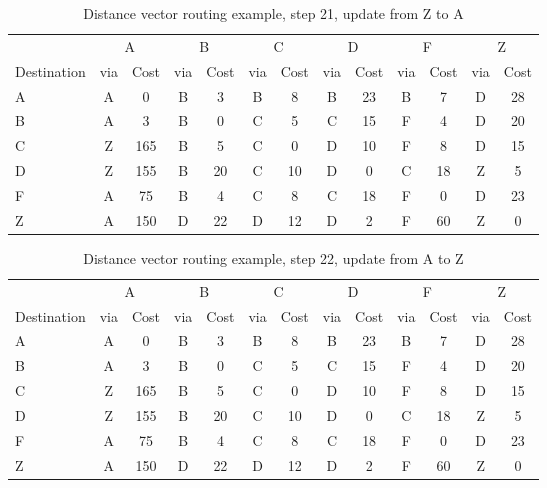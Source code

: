 \begin{table}
    \caption{Distance vector  routing example, step 21, update from Z to A }
    \label{tab:dv:step:21}
\begin{tabular}{l|c|c|c|c|c|c|c|c|c|c|c|c}
    \toprule
      & \multicolumn{2}{c|}{A}&\multicolumn{2}{c|}{B}&\multicolumn{2}{c|}{C}&\multicolumn{2}{c|}{D}&\multicolumn{2}{c|}{F}&\multicolumn{2}{c|}{Z} \\
    Destination & via&Cost&via&Cost&via&Cost&via&Cost&via&Cost&via&Cost \\ 
    \midrule
    A & A & 0 &B & 3 &B & 8 &B & 23 &B & 7 &D & 28 
 \\B & A & 3 &B & 0 &C & 5 &C & 15 &F & 4 &D & 20 
 \\C & Z & 165 &B & 5 &C & 0 &D & 10 &F & 8 &D & 15 
 \\D & Z & 155 &B & 20 &C & 10 &D & 0 &C & 18 &Z & 5 
 \\F & A & 75 &B & 4 &C & 8 &C & 18 &F & 0 &D & 23 
 \\Z & A & 150 &D & 22 &D & 12 &D & 2 &F & 60 &Z & 0 
    \\ \bottomrule 
\end{tabular}
\end{table}
    

\begin{table}
    \caption{Distance vector  routing example, step 22, update from A to Z }
    \label{tab:dv:step:22}
\begin{tabular}{l|c|c|c|c|c|c|c|c|c|c|c|c}
    \toprule
      & \multicolumn{2}{c|}{A}&\multicolumn{2}{c|}{B}&\multicolumn{2}{c|}{C}&\multicolumn{2}{c|}{D}&\multicolumn{2}{c|}{F}&\multicolumn{2}{c|}{Z} \\
    Destination & via&Cost&via&Cost&via&Cost&via&Cost&via&Cost&via&Cost \\ 
    \midrule
    A & A & 0 &B & 3 &B & 8 &B & 23 &B & 7 &D & 28 
 \\B & A & 3 &B & 0 &C & 5 &C & 15 &F & 4 &D & 20 
 \\C & Z & 165 &B & 5 &C & 0 &D & 10 &F & 8 &D & 15 
 \\D & Z & 155 &B & 20 &C & 10 &D & 0 &C & 18 &Z & 5 
 \\F & A & 75 &B & 4 &C & 8 &C & 18 &F & 0 &D & 23 
 \\Z & A & 150 &D & 22 &D & 12 &D & 2 &F & 60 &Z & 0 
    \\ \bottomrule 
\end{tabular}
\end{table}
    

